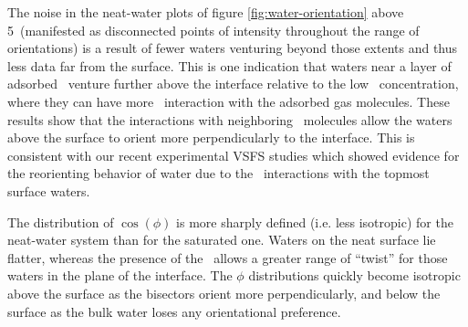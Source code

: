 
The noise in the neat-water plots of figure \ref{fig:water-orientation} above 5\angs~(manifested as disconnected points of intensity throughout the range of orientations) is a result of fewer waters venturing beyond those extents and thus less data far from the surface. This is one indication that waters near a layer of adsorbed \suldiox~venture further above the interface relative to the low \suldiox~concentration, where they can have more \suldiox~interaction with the adsorbed gas molecules. These results show that the interactions with neighboring \suldiox~molecules allow the waters above the surface to orient more perpendicularly to the interface. This is consistent with our recent experimental VSFS studies which showed evidence for the reorienting behavior of water due to the \suldiox~interactions with the topmost surface waters.\cite{Ota2011}

The distribution of $\cos(\phi)$ is more sharply defined (i.e. less isotropic) for the neat-water system than for the saturated one. Waters on the neat surface lie flatter, whereas the presence of the \suldiox~allows a greater range of ``twist'' for those waters in the plane of the interface. The $\phi$ distributions quickly become isotropic above the surface as the bisectors orient more perpendicularly, and below the surface as the bulk water loses any orientational preference.


